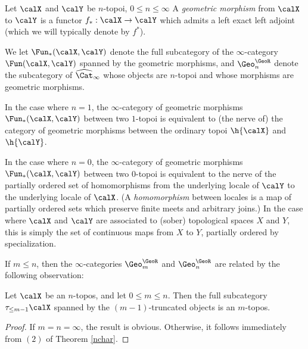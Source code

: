 \begin{definition}\label{geomorphn}
Let $\calX$ and $\calY$ be $n$-topoi, $0 \leq n \leq \infty$
A {\it geometric morphism} from $\calX$ to $\calY$ is a functor $f_{\ast}: \calX \rightarrow \calY$ which admits a left exact left adjoint (which we will typically denote by $f^{\ast}$). 

We let $\Fun_{\ast}(\calX, \calY)$ denote the full subcategory
of the $\infty$-category $\Fun(\calX,\calY)$ spanned by the geometric morphisms, and
$\Geo^{\GeoR}_{n}$ denote the subcategory of $\widehat{\Cat}_{\infty}$ whose objects are $n$-topoi and whose morphisms are geometric morphisms.
\end{definition}

\begin{remark}
In the case where $n=1$, the $\infty$-category of geometric morphisms $\Fun_{\ast}(\calX, \calY)$ between two $1$-topoi is equivalent to (the nerve of) the category of geometric morphisms
between the ordinary topoi $\h{\calX}$ and $\h{\calY}$.
\end{remark}

\begin{remark}
In the case where $n=0$, the $\infty$-category of geometric morphisms $\Fun_{\ast}(\calX, \calY)$
between two $0$-topoi is equivalent to the nerve of the partially ordered set of homomorphisms
from the underlying locale of $\calY$ to the underlying locale of $\calX$. (A {\it homomorphism} between locales is a map of partially ordered sets which preserve finite meets and arbitrary joins.) In the case where $\calX$ and $\calY$ are associated to (sober) topological spaces $X$ and $Y$, this is simply the set of continuous maps from $X$ to $Y$, partially ordered by specialization.
\end{remark}

If $m \leq n$, then the $\infty$-categories 
$\Geo^{\GeoR}_{m}$ and $\Geo^{\GeoR}_{n}$ are related by the following observation:

\begin{proposition}\label{goto1topos}
Let $\calX$ be an $n$-topos, and let $0 \leq m \leq n$. Then the full subcategory
$\tau_{\leq m-1} \calX$ spanned by the $(m-1)$-truncated objects is an $m$-topos.
\end{proposition}

\begin{proof}
If $m = n = \infty$, the result is obvious. Otherwise, it follows immediately from
$(2)$ of Theorem \ref{nchar}.
\end{proof}

